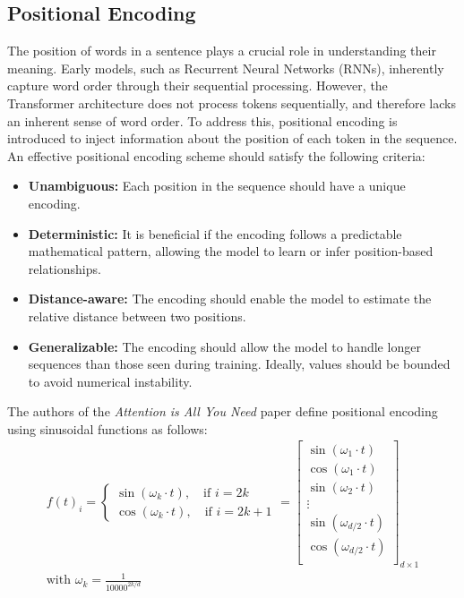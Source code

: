 \subsection{Positional Encoding}
The position of words in a sentence plays a crucial role in understanding their meaning. Early models, such as Recurrent 
Neural Networks (RNNs), inherently capture word order through their sequential processing. However, the Transformer 
architecture does not process tokens sequentially, and therefore lacks an inherent sense of word order. To address this, 
positional encoding is introduced to inject information about the position of each token in the sequence. An effective 
positional encoding scheme should satisfy the following criteria:
\begin{itemize}
    \item \textbf{Unambiguous:} Each position in the sequence should have a unique encoding.
    \item \textbf{Deterministic:} It is beneficial if the encoding follows a predictable mathematical pattern, allowing the 
    model to learn or infer position-based relationships.
    \item \textbf{Distance-aware:} The encoding should enable the model to estimate the relative distance between two 
    positions.
    \item \textbf{Generalizable:} The encoding should allow the model to handle longer sequences than those seen during 
    training. Ideally, values should be bounded to avoid numerical instability.
\end{itemize}
The authors of the \textit{Attention is All You Need} paper \cite{vaswani2023attentionneed} define positional encoding using 
sinusoidal functions as follows:
\begin{gather*}
    f(t)_i = \begin{cases}
        \sin{(\omega_k \cdot t)}, \quad \text{if } i= 2k\\
        \cos{(\omega_k \cdot t)},  \quad \text{if } i= 2k+1
        \end{cases} = \begin{bmatrix}
            \sin{(\omega_{1}\cdot t)} \\
            \cos{(\omega_{1}\cdot t)}\\
            \sin{(\omega_{2}\cdot t)} \\
            \vdots \\
            \sin{(\omega_{d/2}\cdot t)} \\
            \cos{(\omega_{d/2}\cdot t)}\\
         \end{bmatrix}_{d\times 1} \\ 
         \text{with } \omega_k = \frac{1}{10000^{2k/d}}
\end{gather*}

